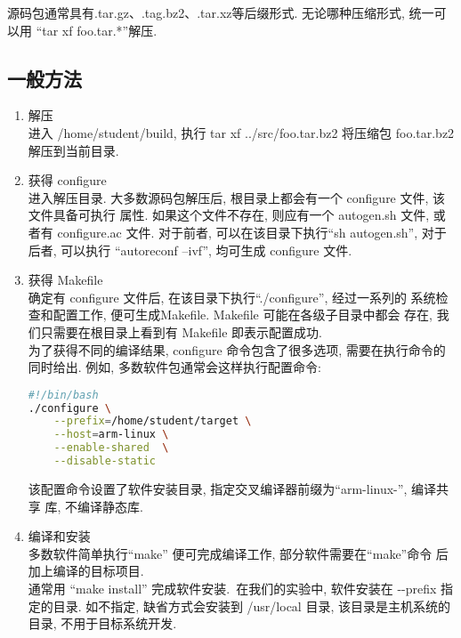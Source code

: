     源码包通常具有.tar.gz、.tag.bz2、.tar.xz等后缀形式. 无论哪种压缩形式,
统一可以用 ``tar xf foo.tar.*''解压.

\subsection{一般方法}
\begin{enumerate}
  \item 解压\\
      进入 /home/student/build, 执行 tar xf ../src/foo.tar.bz2 将压缩包
      foo.tar.bz2 解压到当前目录.
  \item 获得 configure\\
      进入解压目录.
      大多数源码包解压后, 根目录上都会有一个 configure 文件, 该文件具备可执行
      属性. 如果这个文件不存在, 则应有一个 autogen.sh 文件, 或者有
      configure.ac 文件. 对于前者, 可以在该目录下执行``sh autogen.sh'',
      对于后者, 可以执行 ``autoreconf --ivf'', 均可生成 configure 文件.
  \item 获得 Makefile\\
      确定有 configure 文件后, 在该目录下执行``./configure'', 经过一系列的
      系统检查和配置工作, 便可生成Makefile. Makefile 可能在各级子目录中都会
      存在, 我们只需要在根目录上看到有 Makefile 即表示配置成功.\\
      为了获得不同的编译结果, configure 命令包含了很多选项, 需要在执行命令的
      同时给出. 例如, 多数软件包通常会这样执行配置命令:

\lstset{showspaces=false}
\lstset{numbers=none,columns=flexible} 
\lstset{frameround=fttt,frame=trBL}
\begin{lstlisting}[language=bash,firstline=2,deletekeywords=enable]
#!/bin/bash
./configure \
    --prefix=/home/student/target \
    --host=arm-linux \
    --enable-shared  \
    --disable-static
\end{lstlisting}

    该配置命令设置了软件安装目录, 指定交叉编译器前缀为``arm-linux-'', 编译共享
库, 不编译静态库.

  \item 编译和安装\\
      多数软件简单执行``make'' 便可完成编译工作, 部分软件需要在``make''命令
      后加上编译的目标项目.\\
      通常用 ``make install'' 完成软件安装.~在我们的实验中, 软件安装在
      -{}-prefix 指定的目录. 如不指定, 缺省方式会安装到 /usr/local 目录, 
      该目录是主机系统的目录, 不用于目标系统开发.

\end{enumerate}

